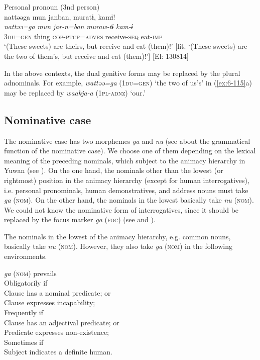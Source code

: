 \ex Personal pronoun (3nd person)\\
{\TM}
\glll  nattəəga  mun  janban,  muratɨ,  kamɨ!\\
\textit{nattəə=ga}  \textit{mun}  \textit{jar-n=ban}  \textit{muraw-tɨ}  \textit{kam-ɨ}\\
3\textsc{du}=\textsc{gen}  thing  \textsc{cop}-\textsc{ptcp}=\textsc{advrs}  receive-\textsc{seq}  eat-\textsc{imp}\\
\glt ‘(These sweets) are theirs, but receive and eat (them)!’ [lit. ‘(These sweets) are the two of them’s, but receive and eat (them)!’]      [El: 130814]

In the above contexts, the dual genitive forms may be replaced by the plural adnominals. For example, \textit{wattəə=ga} (1\textsc{du}=\textsc{gen}) ‘the two of us’s’ in (\ref{ex:6-115}a) may be replaced by \textit{waakja-a} (1\textsc{pl}-\textsc{adnz}) ‘our.’

\subsection{Nominative case}

The nominative case has two morphemes \textit{ga} and \textit{nu} (see  about the grammatical function of the nominative case). We choose one of them depending on the lexical meaning of the preceding nominals, which subject to the animacy hierarchy in Yuwan (see ). On the one hand, the nominals other than the lowest (or rightmost) position in the animacy hierarchy (except for human interrogatives), i.e. personal pronominals, human demonstratives, and address nouns must take \textit{ga} (\textsc{nom}). On the other hand, the nominals in the lowest basically take \textit{nu} (\textsc{nom}). We could not know the nominative form of interrogatives, since it should be replaced by the focus marker \textit{ga} (\textsc{foc}) (see  and ).

The nominals in the lowest of the animacy hierarchy, e.g. common nouns, basically take \textit{nu} (\textsc{nom}). However, they also take \textit{ga} (\textsc{nom}) in the following environments.

\ea\label{ex:6-116}
 \textit{ga} (\textsc{nom}) prevails\\
  Obligatorily if\\

 \ea Clause has a nominal predicate; or\\
\ex Clause expresses incapability;\\
  Frequently if\\
\ex Clause has an adjectival predicate; or\\
\ex Predicate expresses non-existence;\\
  Sometimes if\\
\ex Subject indicates a definite human.\\
\z
\z

